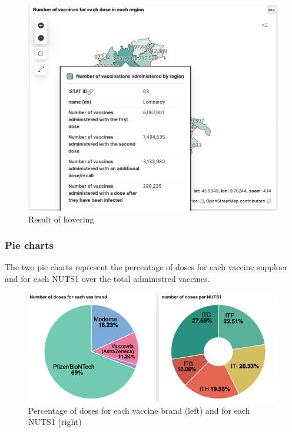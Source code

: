 \documentclass[12pt, a4paper]{article}
\begin{document}
\begin{figure}[H]
  \centering
  \includegraphics[width=.8\linewidth]{img (5).png}
  \caption*{Result of hovering}
\end{figure}

\subsubsection{Pie charts}
The two pie charts represent the percentage of doses for each vaccine supploer and for 
each NUTS1 over the total administred vaccines.
\begin{figure}[H]
  \centering
  \includegraphics[width=1\linewidth]{img (7).png}
  \caption*{Percentage of doses for each vaccine brand  (left) and for each NUTS1 (right)}
\end{figure}
\end{document}
